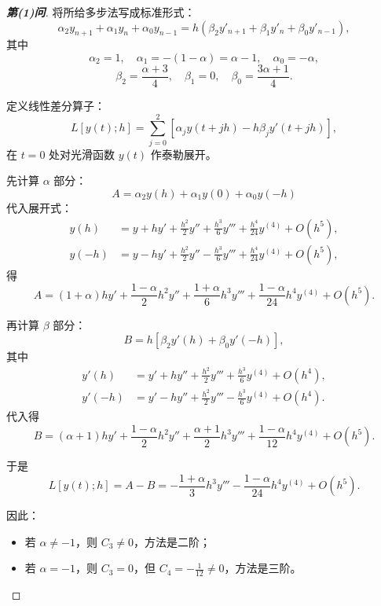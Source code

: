 \documentclass[lang=cn,newtx,12pt,scheme=chinese]{elegantbook}
\begin{document}
\begin{proof}[\textbf{第(1)问}]
	将所给多步法写成标准形式：
	\[
	\alpha_2 y_{n+1} + \alpha_1 y_n + \alpha_0 y_{n-1} = h\left( \beta_2 y'_{n+1} + \beta_1 y'_n + \beta_0 y'_{n-1} \right),
	\]
	其中
	\[
	\alpha_2 = 1,\quad \alpha_1 = -(1-\alpha) = \alpha-1,\quad \alpha_0 = -\alpha,
	\]
	\[
	\beta_2 = \frac{\alpha+3}{4},\quad \beta_1 = 0,\quad \beta_0 = \frac{3\alpha+1}{4}.
	\]
	
	定义线性差分算子：
	\[
	L[y(t);h] = \sum_{j=0}^2 \left[ \alpha_j y(t+jh) - h \beta_j y'(t+jh) \right],
	\]
	在 $t=0$ 处对光滑函数 $y(t)$ 作泰勒展开。
	
	先计算 $\alpha$ 部分：
	\[
	A = \alpha_2 y(h) + \alpha_1 y(0) + \alpha_0 y(-h)
	\]
	代入展开式：
	\begin{align*}
		y(h) &= y + h y' + \frac{h^2}{2} y'' + \frac{h^3}{6} y''' + \frac{h^4}{24} y^{(4)} + O(h^5), \\
		y(-h) &= y - h y' + \frac{h^2}{2} y'' - \frac{h^3}{6} y''' + \frac{h^4}{24} y^{(4)} + O(h^5),
	\end{align*}
	得
	\[
	A = (1+\alpha) h y' + \frac{1-\alpha}{2} h^2 y'' + \frac{1+\alpha}{6} h^3 y''' + \frac{1-\alpha}{24} h^4 y^{(4)} + O(h^5).
	\]
	
	再计算 $\beta$ 部分：
	\[
	B = h\left[ \beta_2 y'(h) + \beta_0 y'(-h) \right],
	\]
	其中
	\begin{align*}
		y'(h) &= y' + h y'' + \frac{h^2}{2} y''' + \frac{h^3}{6} y^{(4)} + O(h^4), \\
		y'(-h) &= y' - h y'' + \frac{h^2}{2} y''' - \frac{h^3}{6} y^{(4)} + O(h^4).
	\end{align*}
	代入得
	\[
	B = (\alpha+1) h y' + \frac{1-\alpha}{2} h^2 y'' + \frac{\alpha+1}{2} h^3 y''' + \frac{1-\alpha}{12} h^4 y^{(4)} + O(h^5).
	\]
	
	于是
	\[
	L[y(t);h] = A - B = -\frac{1+\alpha}{3} h^3 y''' - \frac{1-\alpha}{24} h^4 y^{(4)} + O(h^5).
	\]
	
	因此：
	\begin{itemize}
		\item 若 $\alpha \neq -1$，则 $C_3 \neq 0$，方法是二阶；
		\item 若 $\alpha = -1$，则 $C_3 = 0$，但 $C_4 = -\frac{1}{12} \neq 0$，方法是三阶。
	\end{itemize}
\end{proof}
\end{document}
